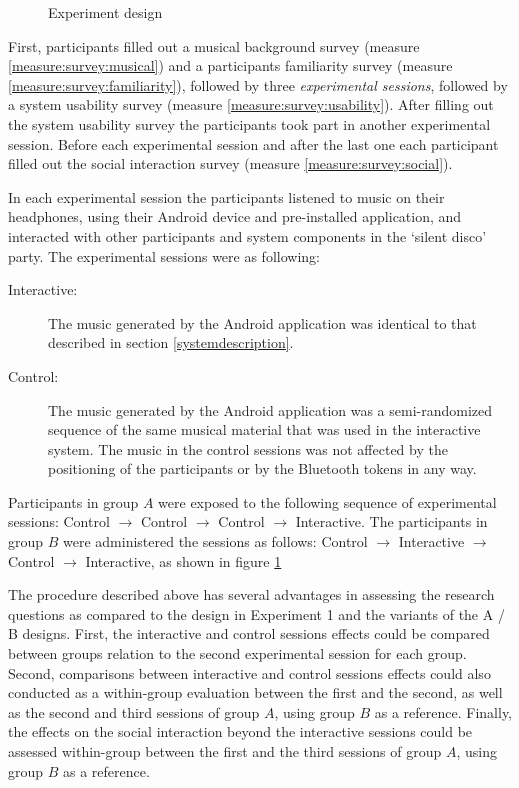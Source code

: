 \documentclass[a4paper,11pt]{article}
\newcommand{\definition}[1]{\emph{#1}}
\begin{document}
{\begin{figure}[!htb]
	\centering
	\def\svgwidth{0.9\textwidth}
  	
	\caption{Experiment design}\label{fig:experiment}
\end{figure}

First, participants filled out a musical background survey (measure \ref{measure:survey:musical}) and a participants familiarity survey (measure \ref{measure:survey:familiarity}), followed by three \definition{experimental sessions}, followed by a system usability survey (measure \ref{measure:survey:usability}).
After filling out the system usability survey the participants took part in another experimental session.
Before each experimental session and after the last one each participant filled out the social interaction survey (measure \ref{measure:survey:social}).

In each experimental session the participants listened to music on their headphones, using their Android device and pre-installed application, and interacted with other participants and system components in the `silent disco' party.
The experimental sessions were as following:

\begin{description}
	\item[Interactive:] The music generated by the Android application was identical to that described in section \ref{systemdescription}.
	\item[Control:] The music generated by the Android application was a semi-randomized sequence of the same musical material that was used in the interactive system.
  The music in the control sessions was not affected by the positioning of the participants or by the Bluetooth tokens in any way.
\end{description}

Participants in group $A$ were exposed to the following sequence of experimental sessions: Control $\rightarrow$ Control $\rightarrow$ Control $\rightarrow$ Interactive.
The participants in group $B$ were administered the sessions as follows: Control $\rightarrow$ Interactive $\rightarrow$ Control $\rightarrow$ Interactive, as shown in figure \ref{fig:experiment}

The procedure described above has several advantages in assessing the research questions as compared to the design in Experiment 1 and the variants of the A / B designs.
First, the interactive and control sessions effects could be compared between groups relation to the second experimental session for each group.
Second, comparisons between interactive and control sessions effects could also conducted as a within-group evaluation between the first and the second, as well as the second and third sessions of group $A$, using group $B$ as a reference.
Finally, the effects on the social interaction beyond the interactive sessions could be assessed within-group between the first and the third sessions of group $A$, using group $B$ as a reference.

}
\end{document}
